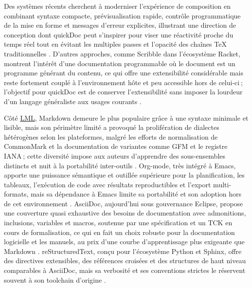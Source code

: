 \documentclass[a4paper,12pt]{article}
\begin{document}
Des systèmes récents cherchent à moderniser l’expérience de composition en combinant syntaxe compacte, prévisualisation rapide, contrôle programmatique de la mise en forme et messages d’erreur explicites, illustrant une direction de conception dont quickDoc peut s’inspirer pour viser une réactivité proche du temps réel tout en évitant les multiples passes et l’opacité des chaînes \TeX{} traditionnelles \autocite{petrolsakTeXNutshell2021,olsakComparisonOpTeXOther2021}. D’autres approches, comme Scribble dans l’écosystème Racket, montrent l’intérêt d’une documentation programmable où le document est un programme générant du contenu, ce qui offre une extensibilité considérable mais reste fortement couplé à l’environnement hôte et peu accessible hors de celui-ci ; l’objectif pour quickDoc est de conserver l’extensibilité sans imposer la lourdeur d’un langage généraliste aux usages courants \autocite{jasonc.whiteUsingMarkupLanguages2022}.

Côté \protect\hyperlink{gls-2}{\label{gls-2-use-2}LML}, Markdown demeure le plus populaire grâce à une syntaxe minimale et lisible, mais son périmètre limité a provoqué la prolifération de dialectes hétérogènes selon les plateformes, malgré les efforts de normalisation de CommonMark et la documentation de variantes comme GFM et le registre IANA ; cette diversité impose aux auteurs d’apprendre des sous-ensembles distincts et nuit à la portabilité inter-outils \autocite{johngruberMarkdownSyntax,johnmacfarlaneCommonMarkSpec2024,GitHubFlavoredMarkdown2019,MarkdownVariants2023}. Org-mode, très intégré à Emacs, apporte une puissance sémantique et outillée supérieure pour la planification, les tableaux, l’exécution de code avec résultats reproductibles et l’export multi-formats, mais sa dépendance à Emacs limite sa portabilité et son adoption hors de cet environnement \autocite{khareUsingOrgmodeSubversion2012}. AsciiDoc, aujourd’hui sous gouvernance Eclipse, propose une couverture quasi exhaustive des besoins de documentation avec admonitions, inclusions, variables et macros, soutenue par une spécification et un TCK en cours de formalisation, ce qui en fait un choix robuste pour la documentation logicielle et les manuels, au prix d’une courbe d’apprentissage plus exigeante que Markdown \autocite{allenAsciiDocSyntaxQuick,allenAsciiDocWritersGuide,EclipseProjectsAsciiDoc2025,donathAdmonitionsMaterialMkDocs}. reStructuredText, conçu pour l’écosystème Python et Sphinx, offre des directives extensibles, des références croisées et des structures de haut niveau comparables à AsciiDoc, mais sa verbosité et ses conventions strictes le réservent souvent à son toolchain d’origine \autocite{goodgerReStructuredTextMarkupSpecification2025}.
\end{document}

